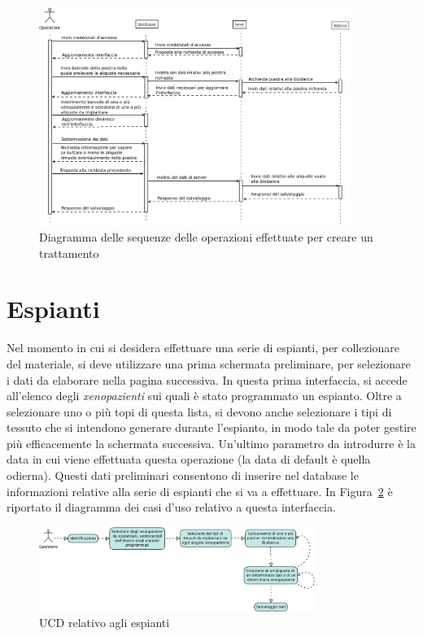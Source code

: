 \begin{figure}[h]
\begin{center}
\includegraphics[width=0.9\textwidth]{./Figure/SDimplants}
\end{center}
\caption{Diagramma delle sequenze delle operazioni effettuate per creare un trattamento\label{fig:SDimpl}}
\end{figure}

\newpage

\section{Espianti}

Nel momento in cui si desidera effettuare una serie di espianti, per collezionare del materiale, si deve utilizzare una prima schermata preliminare, per selezionare i dati da elaborare nella pagina successiva. In questa prima interfaccia, si accede all'elenco degli \textit{xenopazienti} sui quali \`e stato programmato un espianto. Oltre a selezionare uno o pi\`u topi di questa lista, si devono anche selezionare i tipi di tessuto che si intendono generare durante l'espianto, in modo tale da poter gestire pi\`u efficacemente la schermata successiva. Un'ultimo parametro da introdurre \`e la data in cui viene effettuata questa operazione (la data di default \`e quella odierna). Questi dati preliminari consentono di inserire nel database le informazioni relative alla serie di espianti che si va a effettuare. In Figura~\ref{fig:UCDexpl} \`e riportato il diagramma dei casi d'uso relativo a questa interfaccia.

\begin{figure}[h]
\begin{center}
\includegraphics[width=0.8\textwidth]{./Figure/UCDexplants}
\end{center}
\caption{UCD relativo agli espianti\label{fig:UCDexpl}}
\end{figure}

